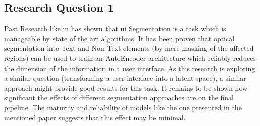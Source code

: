 \documentclass[10pt,a4paper]{scrartcl} %
\begin{document}
\subsection{Research Question 1}
%
Past Research like in \cite{10.1145/3126594.3126651} has shown that \ac{ui} Segmentation is a task which is manageable by state of the art algorithms. It has been proven that optical segmentation into Text and Non-Text elements (by mere masking of the affected regions) can be used to train an AutoEncoder architecture which reliably reduces the dimension 
of the information in a user interface. As this research is exploring a similar question (transforming a user interface into a latent space), a similar approach might provide good results for this task.
It remains to be shown how significant the effects of different segmentation approaches are on the final pipeline. The maturity and reliability of models like the one presented in the mentioned paper suggests that this effect may be minimal.
\end{document}
